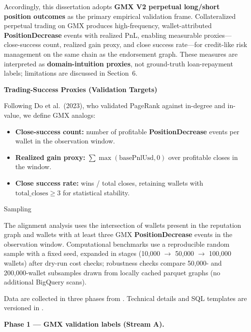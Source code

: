 Accordingly, this dissertation adopts \textbf{GMX V2 perpetual long/short position outcomes} as the primary empirical validation frame. Collateralized perpetual trading on GMX produces high-frequency, wallet-attributed \textbf{PositionDecrease} events with realized PnL, enabling measurable proxies---close-success count, realized gain proxy, and close success rate---for credit-like risk management on the same chain as the endorsement graph. These measures are interpreted as \textbf{domain-intuition proxies}, not ground-truth loan-repayment labels; limitations are discussed in Section~6.


\textbf{Trading-Success Proxies (Validation Targets)}


Following Do et al.\ (2023), who validated PageRank against in-degree and in-value, we define GMX analogs:

\begin{itemize}
\item[\textbullet] \textbf{Close-success count:} number of profitable \textbf{PositionDecrease} events per wallet in the observation window.
\item[\textbullet] \textbf{Realized gain proxy:} $\sum \max(\text{basePnlUsd}, 0)$ over profitable closes in the window.
\item[\textbullet] \textbf{Close success rate:} wins / total closes, retaining wallets with $\text{total\_closes} \geq 3$ for statistical stability.
\end{itemize}


Sampling


The alignment analysis uses the intersection of wallets present in the reputation graph and wallets with at least three GMX \textbf{PositionDecrease} events in the observation window. Computational benchmarks use a reproducible random sample with a fixed seed, expanded in stages (10,000 $\to$ 50,000 $\to$ 100,000 wallets) after dry-run cost checks; robustness checks compare 50,000- and 200,000-wallet subsamples drawn from locally cached parquet graphs (no additional BigQuery scans).



Data are collected in three phases from . Technical details and SQL templates are versioned in .


\textbf{Phase 1 --- GMX validation labels (Stream A).}


